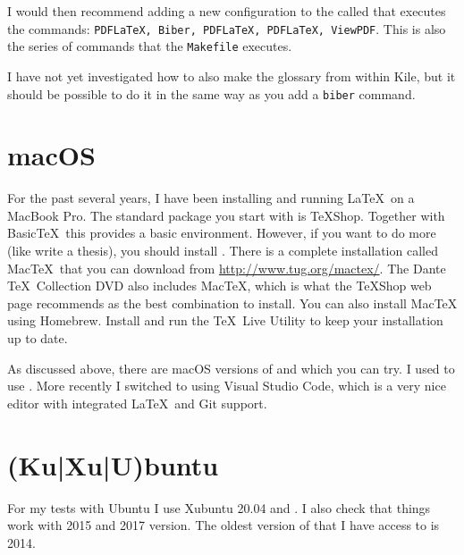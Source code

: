 I would then recommend adding a new configuration to the
 called  that
executes the commands: \texttt{PDFLaTeX, Biber, PDFLaTeX, PDFLaTeX,
  ViewPDF}. This is also the series of commands that the
\texttt{Makefile} executes.

I have not yet investigated how to also make the glossary from within
Kile, but it should be possible to do it in the same way as you add a
\texttt{biber} command.


\section{macOS}%
\label{sec:app:mac}

For the past several years,
I have been installing and running \LaTeX\ on a MacBook Pro.
The standard package you start with is \TeX Shop. 
Together with Basic\TeX\ this provides a basic environment. 
However, if you want to do more (like write a thesis), you should install \TeXLive.
There is a complete \TeXLive installation called Mac\TeX\ 
that you can download from \url{http://www.tug.org/mactex/}.
The Dante \TeX\ Collection DVD also includes Mac\TeX, which is what the \TeX Shop web page
recommends as the best combination to install.
You can also install Mac\TeX{} using Homebrew.
Install and run the \TeX\ Live Utility to keep your installation up to date.

As discussed above, there are macOS versions of \TeXstudio and \TeXmaker which you can try.
I used to use \TeXstudio.
More recently I switched to using Visual Studio Code,
which is a very nice editor with integrated \LaTeX\ and Git support.

\section{(Ku|Xu|U)buntu}%
\label{sec:app:kubuntu}

For my tests with Ubuntu I use Xubuntu 20.04 and .
I also check that things work with 2015 and 2017 version.
The oldest version of \TeXLive that I have access to is 2014.

